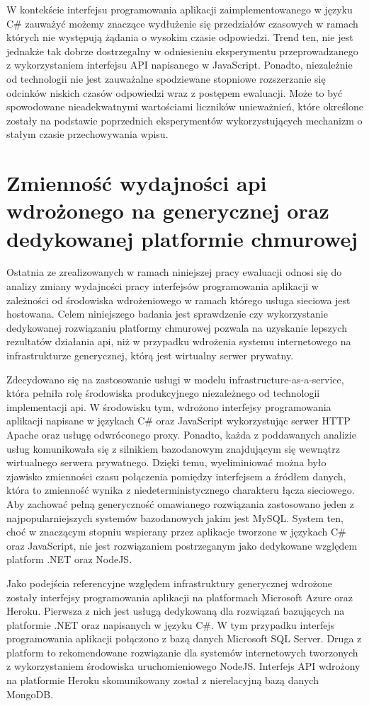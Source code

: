 W kontekście interfejsu programowania aplikacji zaimplementowanego w języku C\# zauważyć możemy znaczące wydłużenie się przedziałów czasowych w ramach których nie występują żądania o wysokim czasie odpowiedzi. Trend ten, nie jest jednakże tak dobrze dostrzegalny w odniesieniu eksperymentu przeprowadzanego z wykorzystaniem interfejsu API napisanego w JavaScript. Ponadto, niezależnie od technologii nie jest zauważalne spodziewane stopniowe rozszerzanie się odcinków niskich czasów odpowiedzi wraz z postępem ewaluacji. Może to być spowodowane nieadekwatnymi wartościami liczników unieważnień, które określone zostały na podstawie poprzednich eksperymentów wykorzystujących mechanizm o stałym czasie przechowywania wpisu.
\section{Zmienność wydajności api wdrożonego na generycznej oraz dedykowanej platformie chmurowej}
Ostatnia ze zrealizowanych w ramach niniejszej pracy ewaluacji odnosi się do analizy zmiany wydajności pracy interfejsów programowania aplikacji w zależności od środowiska wdrożeniowego w ramach którego usługa sieciowa jest hostowana. Celem niniejszego badania jest sprawdzenie czy wykorzystanie dedykowanej rozwiązaniu platformy chmurowej pozwala na uzyskanie lepszych rezultatów działania api, niż w przypadku wdrożenia systemu internetowego na infrastrukturze generycznej, którą jest wirtualny serwer prywatny.

Zdecydowano się na zastosowanie usługi w modelu infrastructure-as-a-service, która pełniła rolę środowiska produkcyjnego niezależnego od technologii implementacji api. W środowisku tym, wdrożono interfejsy programowania aplikacji napisane w językach C\# oraz JavaScript wykorzystując serwer HTTP Apache oraz usługę odwróconego proxy. Ponadto, każda z poddawanych analizie usług komunikowała się z silnikiem bazodanowym znajdującym się wewnątrz wirtualnego serwera prywatnego. Dzięki temu, wyeliminiować można było zjawisko zmienności czasu połączenia pomiędzy interfejsem a źródłem danych, która to zmienność wynika z niedeterministycznego charakteru łącza sieciowego. Aby zachować pełną generyczność omawianego rozwiązania zastosowano jeden z najpopularniejszych systemów bazodanowych jakim jest MySQL. System ten, choć w znaczącym stopniu wspierany przez aplikacje tworzone w językach C\# oraz JavaScript, nie jest rozwiązaniem postrzeganym jako dedykowane względem platform .NET oraz NodeJS. 

Jako podejścia referencyjne względem infrastruktury generycznej wdrożone zostały interfejsy programowania aplikacji na platformach Microsoft Azure oraz Heroku. Pierwsza z nich jest usługą dedykowaną dla rozwiązań bazujących na platformie .NET oraz napisanych w języku C\#. W tym przypadku interfejs programowania aplikacji połączono z bazą danych Microsoft SQL Server. Druga z platform to rekomendowane rozwiązanie dla systemów internetowych tworzonych z wykorzystaniem środowiska uruchomieniowego NodeJS. Interfejs API wdrożony na platformie Heroku skomunikowany został z nierelacyjną bazą danych MongoDB.

